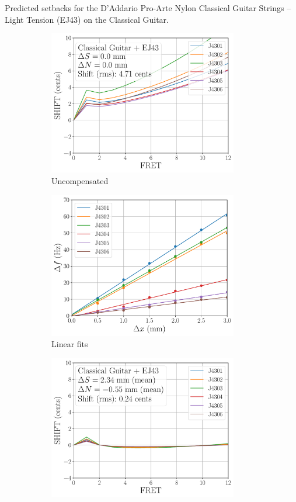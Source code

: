  \begin{table}[htbp]
  \centering
  \caption{\label{tbl:ej43_setbacks} Predicted setbacks for the D'Addario Pro-Arte Nylon Classical Guitar Strings -- Light Tension (EJ43) on the Classical Guitar.}
  
 \end{table}%

 \begin{figure}
  \centering
  \begin{subfigure}[b]{0.45\textwidth}
   \centering
   \includegraphics[width=3.25in]{figures/shift_classicalguitar_ej43_null}
   \caption{Uncompensated}
   \label{fig:shift_classicalguitar_ej43_null}
  \end{subfigure}
  \hspace{0.25in}
  \begin{subfigure}[b]{0.45\textwidth}
   \centering
   \includegraphics[width=3.25in]{figures/fit_ej43}
   \caption{Linear fits}
   \label{fig:fit_ej43}
  \end{subfigure}
  \par\vspace{0.25in}
  \begin{subfigure}[b]{0.45\textwidth}
   \centering
   \includegraphics[width=3.25in]{figures/shift_classicalguitar_ej43_full}

\end{subfigure}
\end{figure}
